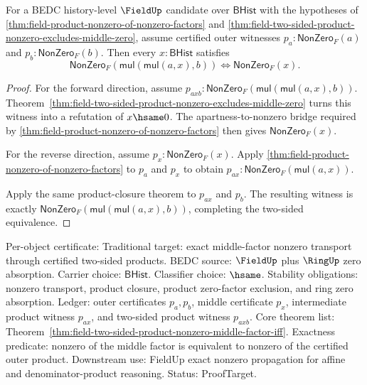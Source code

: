 \begin{theorem}
\label{thm:field-two-sided-product-nonzero-middle-factor-iff}
For a BEDC history-level $\FieldUp$ candidate over $\mathsf{BHist}$ with
the hypotheses of
\autoref{thm:field-product-nonzero-of-nonzero-factors} and
\autoref{thm:field-two-sided-product-nonzero-excludes-middle-zero}, assume
certified outer witnesses $p_a:\mathsf{NonZero}_F(a)$ and
$p_b:\mathsf{NonZero}_F(b)$. Then every $x:\mathsf{BHist}$ satisfies
$$
\mathsf{NonZero}_F(\mathsf{mul}(\mathsf{mul}(a,x),b))
\Longleftrightarrow
\mathsf{NonZero}_F(x).
$$
\end{theorem}
\begin{proof}
For the forward direction, assume
$p_{axb}:\mathsf{NonZero}_F(\mathsf{mul}(\mathsf{mul}(a,x),b))$.
Theorem~\ref{thm:field-two-sided-product-nonzero-excludes-middle-zero}
turns this witness into a refutation of $x\hsame0$. The apartness-to-nonzero
bridge required by
\autoref{thm:field-product-nonzero-of-nonzero-factors} then gives
$\mathsf{NonZero}_F(x)$.

For the reverse direction, assume $p_x:\mathsf{NonZero}_F(x)$. Apply
\autoref{thm:field-product-nonzero-of-nonzero-factors} to $p_a$ and $p_x$
to obtain $p_{ax}:\mathsf{NonZero}_F(\mathsf{mul}(a,x))$.

Apply the same product-closure theorem to $p_{ax}$ and $p_b$. The resulting
witness is exactly
$\mathsf{NonZero}_F(\mathsf{mul}(\mathsf{mul}(a,x),b))$, completing the
two-sided equivalence.
\end{proof}

Per-object certificate: Traditional target: exact middle-factor nonzero
transport through certified two-sided products. BEDC source: $\FieldUp$ plus
$\RingUp$ zero absorption. Carrier choice: $\mathsf{BHist}$. Classifier
choice: $\hsame$. Stability obligations: nonzero transport, product closure,
product zero-factor exclusion, and ring zero absorption. Ledger: outer
certificates $p_a,p_b$, middle certificate $p_x$, intermediate product
witness $p_{ax}$, and two-sided product witness $p_{axb}$. Core theorem list:
Theorem~\ref{thm:field-two-sided-product-nonzero-middle-factor-iff}.
Exactness predicate: nonzero of the middle factor is equivalent to nonzero of
the certified outer product. Downstream use: FieldUp exact nonzero propagation
for affine and denominator-product reasoning. Status: ProofTarget.

